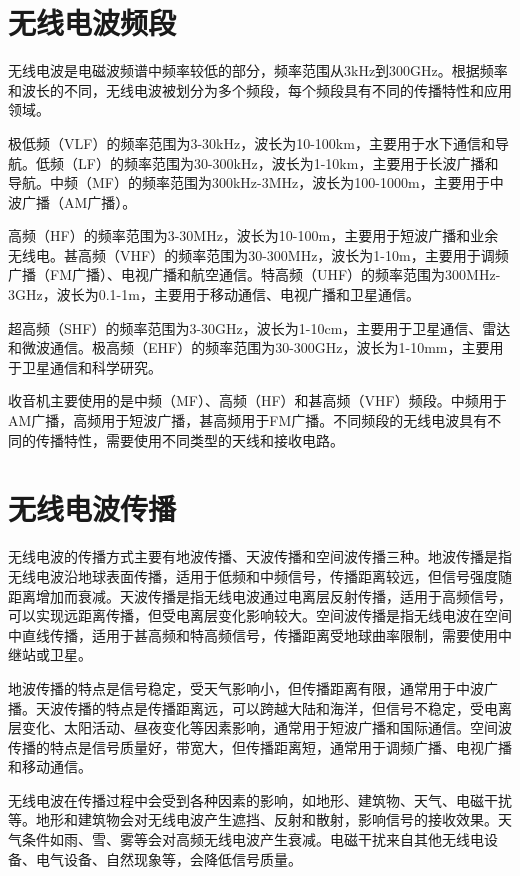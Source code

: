 \documentclass[12pt,UTF8]{ctexbook}
\begin{document}
\section{无线电波频段}

无线电波是电磁波频谱中频率较低的部分，频率范围从3kHz到300GHz。根据频率和波长的不同，无线电波被划分为多个频段，每个频段具有不同的传播特性和应用领域。

极低频（VLF）的频率范围为3-30kHz，波长为10-100km，主要用于水下通信和导航。低频（LF）的频率范围为30-300kHz，波长为1-10km，主要用于长波广播和导航。中频（MF）的频率范围为300kHz-3MHz，波长为100-1000m，主要用于中波广播（AM广播）。

高频（HF）的频率范围为3-30MHz，波长为10-100m，主要用于短波广播和业余无线电。甚高频（VHF）的频率范围为30-300MHz，波长为1-10m，主要用于调频广播（FM广播）、电视广播和航空通信。特高频（UHF）的频率范围为300MHz-3GHz，波长为0.1-1m，主要用于移动通信、电视广播和卫星通信。

超高频（SHF）的频率范围为3-30GHz，波长为1-10cm，主要用于卫星通信、雷达和微波通信。极高频（EHF）的频率范围为30-300GHz，波长为1-10mm，主要用于卫星通信和科学研究。

收音机主要使用的是中频（MF）、高频（HF）和甚高频（VHF）频段。中频用于AM广播，高频用于短波广播，甚高频用于FM广播。不同频段的无线电波具有不同的传播特性，需要使用不同类型的天线和接收电路。

\section{无线电波传播}

无线电波的传播方式主要有地波传播、天波传播和空间波传播三种。地波传播是指无线电波沿地球表面传播，适用于低频和中频信号，传播距离较远，但信号强度随距离增加而衰减。天波传播是指无线电波通过电离层反射传播，适用于高频信号，可以实现远距离传播，但受电离层变化影响较大。空间波传播是指无线电波在空间中直线传播，适用于甚高频和特高频信号，传播距离受地球曲率限制，需要使用中继站或卫星。

地波传播的特点是信号稳定，受天气影响小，但传播距离有限，通常用于中波广播。天波传播的特点是传播距离远，可以跨越大陆和海洋，但信号不稳定，受电离层变化、太阳活动、昼夜变化等因素影响，通常用于短波广播和国际通信。空间波传播的特点是信号质量好，带宽大，但传播距离短，通常用于调频广播、电视广播和移动通信。

无线电波在传播过程中会受到各种因素的影响，如地形、建筑物、天气、电磁干扰等。地形和建筑物会对无线电波产生遮挡、反射和散射，影响信号的接收效果。天气条件如雨、雪、雾等会对高频无线电波产生衰减。电磁干扰来自其他无线电设备、电气设备、自然现象等，会降低信号质量。
\end{document}
